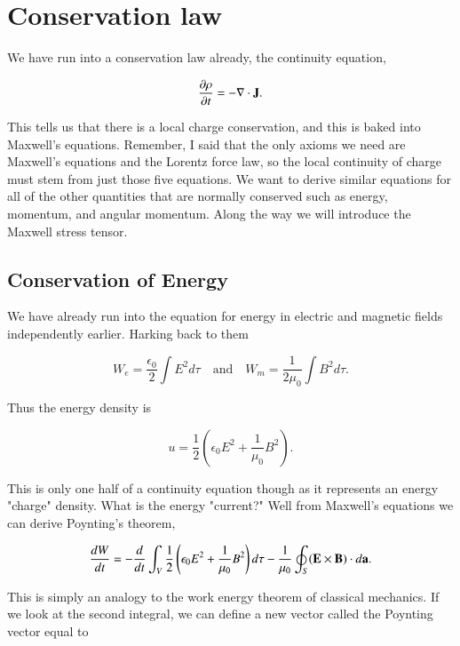 \documentclass[preprint, review,12pt]{elsarticle}
\def\x{\times}
\def\.{\cdot}
\def\b{\textbf}
\def\div{\nabla \.}
\def\and{\quad \text{and} \quad}
\def\9{\left(}
\def\0{\right)}
\newcommand{\pd}[2]{\frac{\partial #1 }{\partial #2}}
\newcommand{\td}[2]{\frac{d #1 }{d #2}}
\begin{document}
\section{Conservation law}

We have run into a conservation law already, the continuity equation,

\begin{equation}
     \pd{\rho}{t} = -\div \b J.
\end{equation}

This tells us that there is a local charge conservation, and this is baked into Maxwell's equations. Remember, I said that the only axioms we need are Maxwell's equations and the Lorentz force law, so the local continuity of charge must stem from just those five equations. We want to derive similar equations for all of the other quantities that are normally conserved such as energy, momentum, and angular momentum. Along the way we will introduce the Maxwell stress tensor.


\subsection{Conservation of Energy}

We have already run into the equation for energy in electric and magnetic fields independently earlier. Harking back to them

\begin{equation*}
    W_e = \frac{\epsilon_0}{2} \int E^2 d\tau \and W_m = \frac{1}{2\mu_0} \int B^2 d\tau.
\end{equation*}

Thus the energy density is

\begin{equation}
    u = \frac{1}{2}(\epsilon_0 E^2 + \frac{1}{\mu_0} B^2).
\end{equation}

This is only one half of a continuity equation though as it represents an energy "charge" density. What is the energy "current?" Well from Maxwell's equations we can derive Poynting's theorem,

\begin{equation}
    \td{W}{t} = - \td{}{t} \int_V \frac{1}{2} \9 \epsilon_0 E^2 + \frac{1}{\mu_0} B^2 \0 d\tau - \frac{1}{\mu_0} \oint_S (\b E \x \b B) \. d\b a.
\end{equation}

This is simply an analogy to the work energy theorem of classical mechanics. If we look at the second integral, we can define a new vector called the Poynting vector equal to
\end{document}
